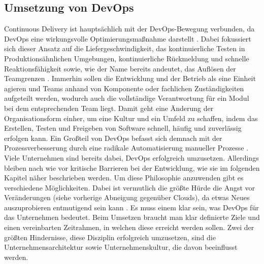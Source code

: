 \subsection{Umsetzung von DevOps}
Continuous Delivery ist hauptsächlich mit der DevOps-Bewegung verbunden, da DevOps eine wirkungsvolle Optimierungsmaßnahme darstellt \cite{continuousdelivery.2017}. Dabei fokussiert sich dieser Ansatz auf die Liefergeschwindigkeit, das kontinuierliche Testen in Produktionsähnlichen Umgebungen, kontinuierliche Rückmeldung und schnelle Reaktionsfähigkeit sowie, wie der Name bereits andeutet, das Auflösen der Teamgrenzen \cite{Virmani.2015}. Immerhin sollen die Entwicklung und der Betrieb als eine Einheit agieren und Teams anhand von Komponente oder fachlichen Zuständigkeiten aufgeteilt werden, wodurch auch die vollständige Verantwortung für ein Modul bei dem entsprechenden Team liegt. Damit geht eine Änderung der Organisationsform einher, um eine Kultur und ein Umfeld zu schaffen, indem das Erstellen, Testen und Freigeben von Software schnell, häufig und zuverlässig erfolgen kann. Ein Großteil von DevOps befasst sich demnach mit der Prozessverbesserung durch eine radikale Automatisierung manueller Prozesse \cite{DevOps.2016}.\\ Viele Unternehmen sind bereits dabei, DevOps erfolgreich umzusetzen. Allerdings bleiben nach wie vor kritische Barrieren bei der Entwicklung, wie sie im folgenden Kapitel näher beschrieben werden. Um diese Philosophie anzuwenden gibt es verschiedene Möglichkeiten. Dabei ist vermutlich die größte Hürde die Angst vor Veränderungen (siehe vorherige Abneigung gegenüber Clouds), da etwas Neues auszuprobieren entmutigend sein kann \cite{continuousdelivery.2017}. 
Es muss einem klar sein, was DevOps für das Unternehmen bedeutet. Beim Umsetzen braucht man klar definierte Ziele und einen vereinbarten Zeitrahmen, in welchen diese erreicht werden sollen. Zwei der größten Hindernisse, diese Disziplin erfolgreich umzusetzen, sind die Unternehmensarchitektur sowie Unternehmenskultur, die davon beeinflusst werden.


